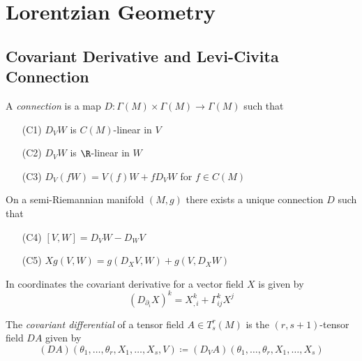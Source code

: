 \section{Lorentzian Geometry}
\subsection{Covariant Derivative and Levi-Civita Connection}

\begin{definition}[Connection]
A \emph{connection} is a map $D:\Gamma(M)\times\Gamma(M)\to\Gamma(M)$ such that

\begin{itemize}
    \item[(C1)] $D_VW$ is $C(M)$-linear in $V$
    \item[(C2)] $D_VW$ is $\R$-linear in $W$
    \item[(C3)] $D_V(fW) = V(f)W + fD_VW$ for $f\in C(M)$
\end{itemize}

\end{definition}

\begin{theorem}
On a semi-Riemannian manifold $(M,g)$ there exists a unique connection $D$ such that
\begin{itemize}
    \item[(C4)] $[V,W] = D_VW-D_WV$
    \item[(C5)] $Xg(V,W)=g(D_XV,W)+g(V,D_XW)$
\end{itemize}
\end{theorem}


\begin{proposition}
In coordinates the covariant derivative for a vector field $X$ is given by 
\begin{equation*}
    (D_{\partial_i}X)^{k} = X^k_{,i}+\Gamma^k_{ij}X^j
\end{equation*}
\end{proposition}

\begin{definition}
The \emph{covariant differential} of a tensor field $A\in T^r_s(M)$ is the $(r,s+1)$-tensor field $DA$ given by
\begin{equation*}
    (DA)(\theta_1,\dots,\theta_r,X_1,\dots,X_s,V) \coloneqq (D_VA)(\theta_1,\dots,\theta_r,X_1,\dots,X_s)
\end{equation*}
\end{definition}

